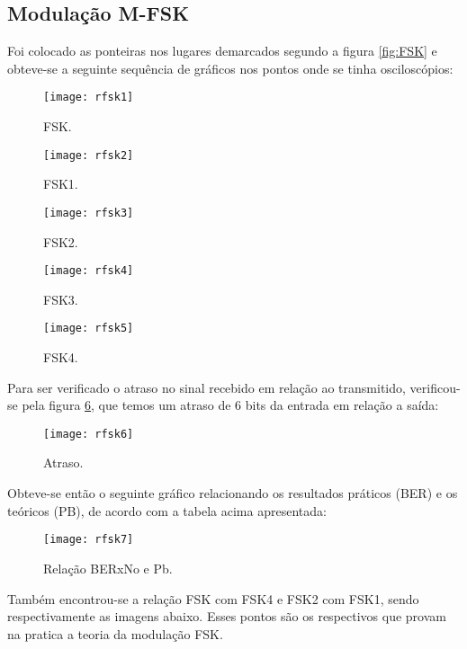 \subsection{Modulação M-FSK}
Foi colocado as ponteiras nos lugares demarcados segundo a figura \ref{fig:FSK} e obteve-se a seguinte sequência de gráficos nos pontos onde se tinha osciloscópios:

\begin{figure}[H]
    \centering
    \texttt{[image: rfsk1]}
    \caption{FSK.}
    \label{fig:rpsk1}
\end{figure}

\begin{figure}[H]
    \centering
    \texttt{[image: rfsk2]}
    \caption{FSK1.}
    \label{fig:rfsk2}
\end{figure}

\begin{figure}[H]
    \centering
    \texttt{[image: rfsk3]}
    \caption{FSK2.}
    \label{fig:rfsk3}
\end{figure}

\begin{figure}[H]
    \centering
    \texttt{[image: rfsk4]}
    \caption{FSK3.}
    \label{fig:rfsk4}
\end{figure}

\begin{figure}[H]
    \centering
    \texttt{[image: rfsk5]}
    \caption{FSK4.}
    \label{fig:rfsk5}
\end{figure}

Para ser verificado o atraso no sinal recebido em relação ao transmitido, verificou-se pela figura \ref{fig:rfsk6}, que temos um atraso de 6 bits da entrada em relação a saída:
\begin{figure}[H]
    \centering
    \texttt{[image: rfsk6]}
    \caption{Atraso.}
    \label{fig:rfsk6}
\end{figure}


Obteve-se então o seguinte gráfico relacionando os resultados práticos (BER) e os teóricos (PB), de acordo com a tabela acima apresentada:

\begin{figure}[H]
    \centering
    \texttt{[image: rfsk7]}
    \caption{Relação BERxNo e Pb.}
    \label{fig:rfsk7}
\end{figure}

Também encontrou-se a relação FSK com FSK4 e FSK2 com FSK1, sendo respectivamente as imagens abaixo. Esses pontos são os respectivos que provam na pratica a teoria da modulação FSK.


